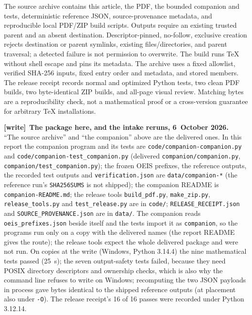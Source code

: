 \documentclass[11pt,letterpaper]{article}
\theoremstyle{remark}\newtheorem{remark}[theorem]{Remark}
\newcommand{\file}[1]{\nolinkurl{#1}}
\newenvironment{writenote}[1][]{\par\smallskip\begingroup\small
 \noindent\textbf{[write]}\if\relax\detokenize{#1}\relax\else~\textbf{#1.}\fi\ }%
 {\par\endgroup\smallskip}
\begin{document}
The source archive contains this article, the PDF, the bounded companion and tests, deterministic reference JSON, source-provenance metadata, and reproducible local PDF/ZIP build scripts. Outputs require an existing trusted parent and an absent destination. Descriptor-pinned, no-follow, exclusive creation rejects destination or parent symlinks, existing files/directories, and parent traversal; a detected failure is not permission to overwrite. The build runs TeX without shell escape and pins its metadata. The archive uses a fixed allowlist, verified SHA-256 inputs, fixed entry order and metadata, and stored members. The release receipt records normal and optimized Python tests, two clean PDF builds, two byte-identical ZIP builds, and all-page visual review. Matching bytes are a reproducibility check, not a mathematical proof or a cross-version guarantee for arbitrary TeX installations.

\begin{writenote}[The package here, and the intake reruns, 6~October 2026]
``The source archive'' and ``the companion'' above are the delivered ones.
In this report the companion program and its tests are
\file{code/companion-companion.py} and \file{code/companion-test_companion.py}
(delivered \file{companion/companion.py}, \file{companion/test_companion.py});
the frozen OEIS prefixes, the reference outputs, the recorded test outputs and
\file{verification.json} are \file{data/companion-*} (the reference run's
\file{SHA256SUMS} is not shipped); the companion README is
\file{companion-README.md}; the release tools \file{build_pdf.py},
\file{make_zip.py}, \file{release_tools.py} and \file{test_release.py} are in
\file{code/}; \file{RELEASE_RECEIPT.json} and \file{SOURCE_PROVENANCE.json}
are in \file{data/}. The companion reads \file{oeis_prefixes.json} beside
itself and the tests import it as \file{companion}, so the programs run only
on a copy with the delivered names (the report README gives the route); the
release tools expect the whole delivered package and were not run. On copies
at the write (Windows, Python 3.14.4) the nine mathematical tests passed
(25~s); the seven output-safety tests failed, because they need POSIX
directory descriptors and ownership checks, which is also why the command
line refuses to write on Windows; recomputing the two JSON payloads in
process gave bytes identical to the shipped reference outputs (at placement
also under \texttt{-O}). The release receipt's 16 of 16 passes were recorded
under Python 3.12.14.
\end{writenote}
\end{document}
